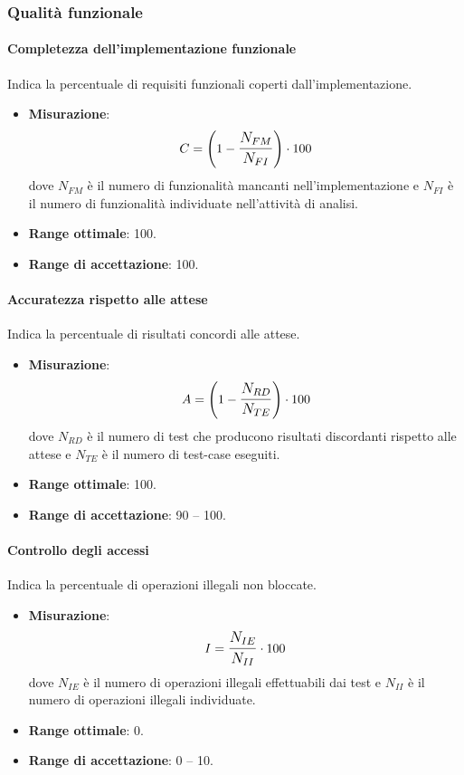 \subsubsection{Qualità funzionale}

\paragraph{Completezza dell'implementazione funzionale}
Indica la percentuale di requisiti funzionali coperti dall'implementazione.
\begin{itemize}
	\item \textbf{Misurazione}: 
		$$C=\left(1-\mathlarger{\frac{N_{FM}}{N_{FI}}}\right) \cdot 100$$ 
	dove $N_{FM}$ è il numero di funzionalità mancanti nell'implementazione e $N_{FI}$ è il numero di funzionalità individuate nell'attività di analisi.
	\item \textbf{Range ottimale}: 100.
	\item \textbf{Range di accettazione}: 100.
\end{itemize}

\paragraph{Accuratezza rispetto alle attese}
Indica la percentuale di risultati concordi alle attese.
\begin{itemize}
	\item \textbf{Misurazione}: 
		$$A=\left(1-\mathlarger{\frac{N_{RD}}{N_{TE}}}\right) \cdot 100$$
	dove $N_{RD}$ è il numero di test che producono risultati discordanti rispetto alle attese e $N_{TE}$ è il numero di test-case eseguiti.
	\item \textbf{Range ottimale}: 100.
	\item \textbf{Range di accettazione}: 90 -- 100.
\end{itemize}

\paragraph{Controllo degli accessi}
Indica la percentuale di operazioni illegali non bloccate.
\begin{itemize}
	\item \textbf{Misurazione}: 
		$$I=\mathlarger{\frac{N_{IE}}{N_{II}}} \cdot 100$$
	dove $N_{IE}$ è il numero di operazioni illegali effettuabili dai test e $N_{II}$ è il numero di operazioni illegali individuate.
	\item \textbf{Range ottimale}: 0.
	\item \textbf{Range di accettazione}: 0 -- 10.
\end{itemize}

